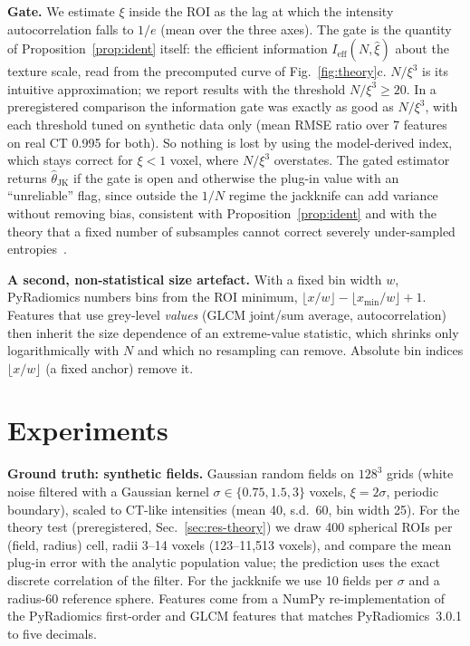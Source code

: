 \documentclass[runningheads]{llncs}
\begin{document}
\noindent\textbf{Gate.} We estimate $\xi$ inside the ROI as the lag at which the intensity autocorrelation falls to $1/e$ (mean over the three axes). The gate is the quantity of Proposition~\ref{prop:ident} itself: the efficient information $I_{\mathrm{eff}}(N,\hat\xi)$ about the texture scale, read from the precomputed curve of Fig.~\ref{fig:theory}c. $N/\xi^3$ is its intuitive approximation; we report results with the threshold $N/\xi^3\ge20$. In a preregistered comparison the information gate was exactly as good as $N/\xi^3$, with each threshold tuned on synthetic data only (mean RMSE ratio over 7 features on real CT 0.995 for both). So nothing is lost by using the model-derived index, which stays correct for $\xi<1$ voxel, where $N/\xi^3$ overstates. The gated estimator returns $\hat\theta_{\mathrm{JK}}$ if the gate is open and otherwise the plug-in value with an ``unreliable'' flag, since outside the $1/N$ regime the jackknife can add variance without removing bias, consistent with Proposition~\ref{prop:ident} and with the theory that a fixed number of subsamples cannot correct severely under-sampled entropies~\cite{jiao2020}.

\noindent\textbf{A second, non-statistical size artefact.} With a fixed bin width $w$, PyRadiomics numbers bins from the ROI minimum, $\lfloor x/w\rfloor-\lfloor x_{\min}/w\rfloor+1$. Features that use grey-level \emph{values} (GLCM joint/sum average, autocorrelation) then inherit the size dependence of an extreme-value statistic, which shrinks only logarithmically with $N$ and which no resampling can remove. Absolute bin indices $\lfloor x/w\rfloor$ (a fixed anchor) remove it.

\section{Experiments}\label{sec:exp}
\noindent\textbf{Ground truth: synthetic fields.} Gaussian random fields on $128^3$ grids (white noise filtered with a Gaussian kernel $\sigma\in\{0.75,1.5,3\}$ voxels, $\xi=2\sigma$, periodic boundary), scaled to CT-like intensities (mean 40, s.d.\ 60, bin width 25). For the theory test (preregistered, Sec.~\ref{sec:res-theory}) we draw 400 spherical ROIs per (field, radius) cell, radii 3--14 voxels (123--11{,}513 voxels), and compare the mean plug-in error with the analytic population value; the prediction uses the exact discrete correlation of the filter. For the jackknife we use 10 fields per $\sigma$ and a radius-60 reference sphere. Features come from a NumPy re-implementation of the PyRadiomics first-order and GLCM features that matches PyRadiomics~3.0.1 to five decimals.
\end{document}
